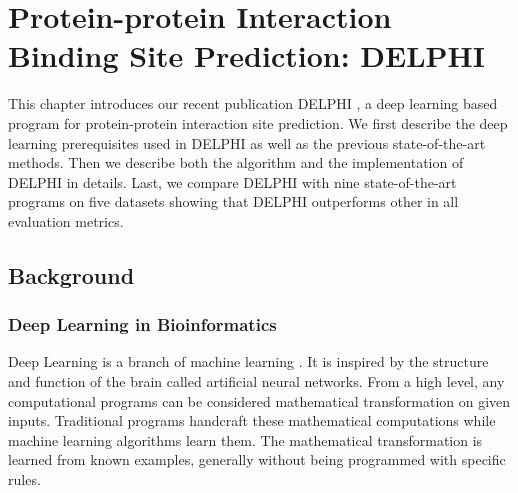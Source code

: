 \chapter{Protein-protein Interaction Binding Site Prediction: DELPHI \label{chap_2}}
This chapter introduces our recent publication DELPHI \cite{li2020delphi}, a deep learning based program for protein-protein interaction site prediction. We first describe the deep learning prerequisites used in DELPHI as well as the previous state-of-the-art methods. Then we describe both the algorithm and the implementation of DELPHI in details. Last, we compare DELPHI with nine state-of-the-art programs on five datasets showing that DELPHI outperforms other in all evaluation metrics. 
\section{Background}
\subsection{Deep Learning in Bioinformatics} \label{set_AI_in_bioinfor}
Deep Learning is a branch of machine learning \cite{goodfellow2016deep}. It is inspired by the structure and function of the brain called artificial neural networks. From a high level, any computational programs can be considered mathematical transformation on given inputs. Traditional programs handcraft these mathematical computations while machine learning algorithms learn them. The mathematical transformation is learned from known examples, generally without being programmed with specific rules.

